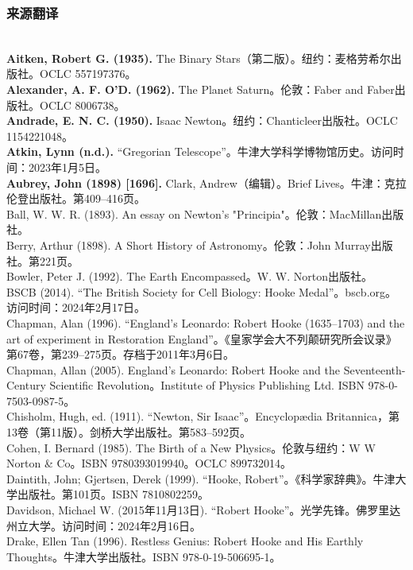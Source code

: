 \subsubsection{来源翻译}\\
\textbf{Aitken, Robert G. (1935).} The Binary Stars（第二版）。纽约：麦格劳希尔出版社。OCLC 557197376。\\
\textbf{Alexander, A. F. O'D. (1962).} The Planet Saturn。伦敦：Faber and Faber出版社。OCLC 8006738。\\
\textbf{Andrade, E. N. C. (1950).} Isaac Newton。纽约：Chanticleer出版社。OCLC 1154221048。\\
\textbf{Atkin, Lynn (n.d.). }“Gregorian Telescope”。牛津大学科学博物馆历史。访问时间：2023年1月5日。\\  
\textbf{Aubrey, John (1898) [1696]. }Clark, Andrew（编辑）。Brief Lives。牛津：克拉伦登出版社。第409–416页。\\ 
Ball, W. W. R. (1893). An essay on Newton's "Principia"。伦敦：MacMillan出版社。\\
Berry, Arthur (1898). A Short History of Astronomy。伦敦：John Murray出版社。第221页。\\
Bowler, Peter J. (1992). The Earth Encompassed。W. W. Norton出版社。\\  
BSCB (2014). “The British Society for Cell Biology: Hooke Medal”。bscb.org。访问时间：2024年2月17日。\\
Chapman, Alan (1996). “England's Leonardo: Robert Hooke (1635–1703) and the art of experiment in Restoration England”。《皇家学会大不列颠研究所会议录》第67卷，第239–275页。存档于2011年3月6日。\\
Chapman, Allan (2005). England's Leonardo: Robert Hooke and the Seventeenth-Century Scientific Revolution。Institute of Physics Publishing Ltd. ISBN 978-0-7503-0987-5。\\
Chisholm, Hugh, ed. (1911). “Newton, Sir Isaac”。Encyclopædia Britannica，第13卷（第11版）。剑桥大学出版社。第583–592页。\\
Cohen, I. Bernard (1985). The Birth of a New Physics。伦敦与纽约：W W Norton & Co。ISBN 9780393019940。OCLC 899732014。\\
Daintith, John; Gjertsen, Derek (1999). “Hooke, Robert”。《科学家辞典》。牛津大学出版社。第101页。ISBN 7810802259。\\
Davidson, Michael W. (2015年11月13日). “Robert Hooke”。光学先锋。佛罗里达州立大学。访问时间：2024年2月16日。\\
Drake, Ellen Tan (1996). Restless Genius: Robert Hooke and His Earthly Thoughts。牛津大学出版社。ISBN 978-0-19-506695-1。\\
